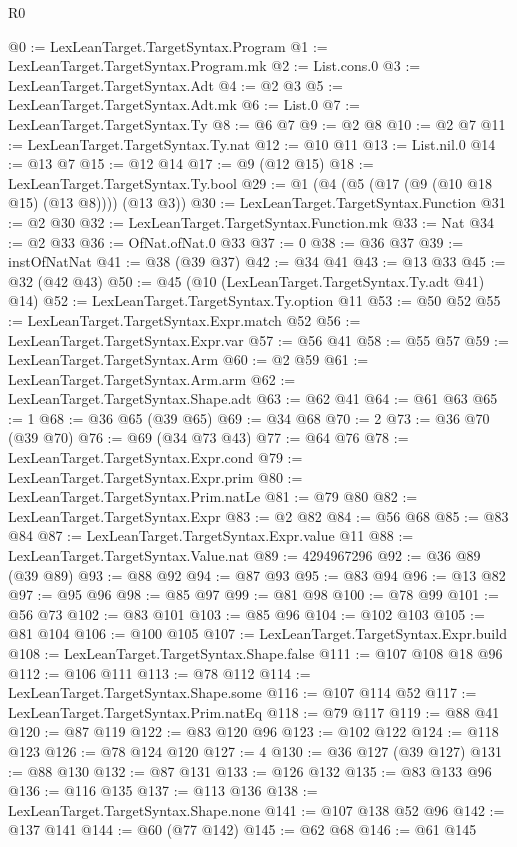 \begin{lexlean}{R0}
\begin{coremodule}
@0 := LexLeanTarget.TargetSyntax.Program
@1 := LexLeanTarget.TargetSyntax.Program.mk
@2 := List.cons.{0}
@3 := LexLeanTarget.TargetSyntax.Adt
@4 := @2 @3
@5 := LexLeanTarget.TargetSyntax.Adt.mk
@6 := List.{0}
@7 := LexLeanTarget.TargetSyntax.Ty
@8 := @6 @7
@9 := @2 @8
@10 := @2 @7
@11 := LexLeanTarget.TargetSyntax.Ty.nat
@12 := @10 @11
@13 := List.nil.{0}
@14 := @13 @7
@15 := @12 @14
@17 := @9 (@12 @15)
@18 := LexLeanTarget.TargetSyntax.Ty.bool
@29 := @1 (@4 (@5 (@17 (@9 (@10 @18 @15) (@13 @8)))) (@13 @3))
@30 := LexLeanTarget.TargetSyntax.Function
@31 := @2 @30
@32 := LexLeanTarget.TargetSyntax.Function.mk
@33 := Nat
@34 := @2 @33
@36 := OfNat.ofNat.{0} @33
@37 := 0
@38 := @36 @37
@39 := instOfNatNat
@41 := @38 (@39 @37)
@42 := @34 @41
@43 := @13 @33
@45 := @32 (@42 @43)
@50 := @45 (@10 (LexLeanTarget.TargetSyntax.Ty.adt @41) @14)
@52 := LexLeanTarget.TargetSyntax.Ty.option @11
@53 := @50 @52
@55 := LexLeanTarget.TargetSyntax.Expr.match @52
@56 := LexLeanTarget.TargetSyntax.Expr.var
@57 := @56 @41
@58 := @55 @57
@59 := LexLeanTarget.TargetSyntax.Arm
@60 := @2 @59
@61 := LexLeanTarget.TargetSyntax.Arm.arm
@62 := LexLeanTarget.TargetSyntax.Shape.adt
@63 := @62 @41
@64 := @61 @63
@65 := 1
@68 := @36 @65 (@39 @65)
@69 := @34 @68
@70 := 2
@73 := @36 @70 (@39 @70)
@76 := @69 (@34 @73 @43)
@77 := @64 @76
@78 := LexLeanTarget.TargetSyntax.Expr.cond
@79 := LexLeanTarget.TargetSyntax.Expr.prim
@80 := LexLeanTarget.TargetSyntax.Prim.natLe
@81 := @79 @80
@82 := LexLeanTarget.TargetSyntax.Expr
@83 := @2 @82
@84 := @56 @68
@85 := @83 @84
@87 := LexLeanTarget.TargetSyntax.Expr.value @11
@88 := LexLeanTarget.TargetSyntax.Value.nat
@89 := 4294967296
@92 := @36 @89 (@39 @89)
@93 := @88 @92
@94 := @87 @93
@95 := @83 @94
@96 := @13 @82
@97 := @95 @96
@98 := @85 @97
@99 := @81 @98
@100 := @78 @99
@101 := @56 @73
@102 := @83 @101
@103 := @85 @96
@104 := @102 @103
@105 := @81 @104
@106 := @100 @105
@107 := LexLeanTarget.TargetSyntax.Expr.build
@108 := LexLeanTarget.TargetSyntax.Shape.false
@111 := @107 @108 @18 @96
@112 := @106 @111
@113 := @78 @112
@114 := LexLeanTarget.TargetSyntax.Shape.some
@116 := @107 @114 @52
@117 := LexLeanTarget.TargetSyntax.Prim.natEq
@118 := @79 @117
@119 := @88 @41
@120 := @87 @119
@122 := @83 @120 @96
@123 := @102 @122
@124 := @118 @123
@126 := @78 @124 @120
@127 := 4
@130 := @36 @127 (@39 @127)
@131 := @88 @130
@132 := @87 @131
@133 := @126 @132
@135 := @83 @133 @96
@136 := @116 @135
@137 := @113 @136
@138 := LexLeanTarget.TargetSyntax.Shape.none
@141 := @107 @138 @52 @96
@142 := @137 @141
@144 := @60 (@77 @142)
@145 := @62 @68
@146 := @61 @145

\end{coremodule}
\end{lexlean}
